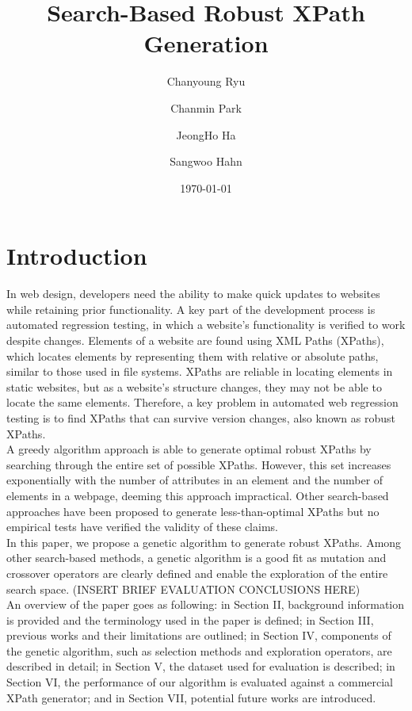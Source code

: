 \documentclass[format=acmlarge, nonacm=true]{acmart}
\title{Search-Based Robust XPath Generation}
\author{Chanyoung Ryu}
\affiliation{KAIST Department of Computer Science}
\author{Chanmin Park}
\affiliation{KAIST Department of Computer Science}
\author{JeongHo Ha}
\affiliation{KAIST Department of Computer Science}
\author{Sangwoo Hahn}
\affiliation{KAIST Department of Computer Science}
\date{\today}
\begin{document}
\maketitle
\section{Introduction}
In web design, developers need the ability to make quick updates to websites while retaining prior functionality. A key part of the development process is automated regression testing, in which a website’s functionality is verified to work despite changes. Elements of a website are found using XML Paths (XPaths), which locates elements by representing them with relative or absolute paths, similar to those used in file systems. XPaths are reliable in locating elements in static websites, but as a website's structure changes, they may not be able to locate the same elements. Therefore, a key problem in automated web regression testing is to find XPaths that can survive version changes, also known as robust XPaths.\\

A greedy algorithm approach is able to generate optimal robust XPaths by searching through the entire set of possible XPaths. However, this set increases exponentially with the number of attributes in an element and the number of elements in a webpage, deeming this approach impractical. Other search-based approaches have been proposed to generate less-than-optimal XPaths but no empirical tests have verified the validity of these claims.\\

In this paper, we propose a genetic algorithm to generate robust XPaths. Among other search-based methods, a genetic algorithm is a good fit as mutation and crossover operators are clearly defined and enable the exploration of the entire search space. (INSERT BRIEF EVALUATION CONCLUSIONS HERE) \\

An overview of the paper goes as following: in Section II, background information is provided and the terminology used in the paper is defined; in Section III, previous works and their limitations are outlined; in Section IV, components of the genetic algorithm, such as selection methods and exploration operators, are described in detail; in Section V, the dataset used for evaluation is described; in Section VI, the performance of our algorithm is evaluated against a commercial XPath generator; and in Section VII, potential future works are introduced.\\
\end{document}

